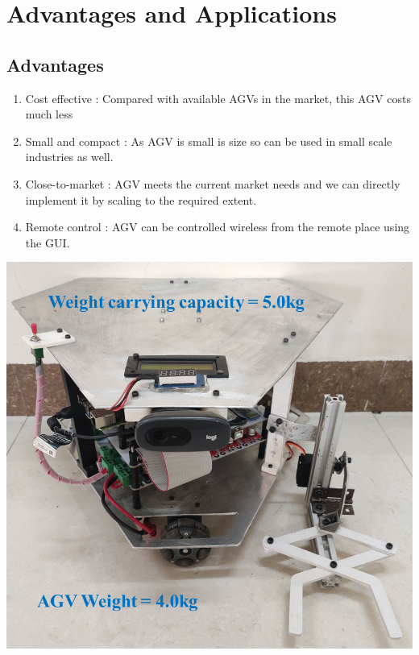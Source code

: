\chapter{Advantages and Applications}
\section{Advantages}


\begin{minipage}[c]{0.45\textwidth}
\begin{enumerate}
    \item Cost effective : Compared with available AGVs in the market, this AGV costs much less
    \item Small and compact : As AGV is small is size so can be used in small scale industries as well.
    \item Close-to-market : AGV meets the current market needs and we can directly implement it by scaling to the required extent.
    \item Remote control : AGV can be controlled wireless from the remote place using the GUI.
\end{enumerate}
\end{minipage}
\hfill
\begin{minipage}[c]{0.4\textwidth}
\includegraphics[width=\textwidth]{project/images/agv03.png}
\end{minipage}
